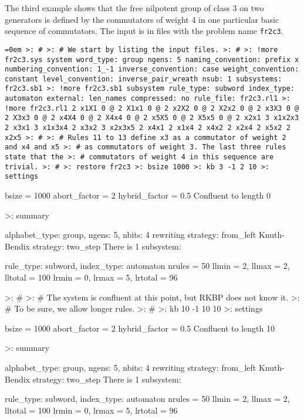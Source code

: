 \bigskip

The third example shows that the free nilpotent group of class 3 on
two generators is defined by the commutators of weight 4 in one
particular basic sequence of commutators.  The input is in files with
the problem name {\tt fr2c3}.

\bigskip

{\tt \obeylines\obeyspaces \parindent=0em \parskip=0in \ttspace
>: \#
>: \# We start by listing the input files.
>: \#
>: !more fr2c3.sys
system
word\_type:  group
ngens:  5
naming\_convention:  prefix x
numbering\_convention:  1\_-1
inverse\_convention:  case
weight\_convention:  constant
level\_convention:  inverse\_pair\_wreath
nsub:  1
subsystems:  
fr2c3.sb1
>: !more fr2c3.sb1
subsystem
rule\_type:  subword
index\_type:  automaton
external:  len\_names
compressed:  no
rule\_file:  fr2c3.rl1
>: !more fr2c3.rl1
2 x1X1 0 @
2 X1x1 0 @
2 x2X2 0 @
2 X2x2 0 @
2 x3X3 0 @
2 X3x3 0 @
2 x4X4 0 @
2 X4x4 0 @
2 x5X5 0 @
2 X5x5 0 @
2 x2x1 3 x1x2x3
2 x3x1 3 x1x3x4
2 x3x2 3 x2x3x5
2 x4x1 2 x1x4
2 x4x2 2 x2x4
2 x5x2 2 x2x5
>: \#
>: \# Rules 11 to 13 define x3 as a commutator of weight 2 and x4 and x5
>: \# as commutators of weight 3.  The last three rules state that the
>: \# commutators of weight 4 in this sequence are trivial.
>: \#
>: restore fr2c3
>: bsize 1000
>: kb 3 -1 2 10
>: settings

bsize         = 1000
abort\_factor  =      2
hybrid\_factor =      0.5
Confluent to length 0

>: summary

alphabet\_type:  group,  ngens:  5,   nbits:  4
rewriting strategy:  from\_left
Knuth-Bendix strategy:  two\_step
There is 1 subsystem:

rule\_type:  subword,  index\_type:  automaton
nrules = 50
llmin  = 2,  llmax = 2,  lltotal = 100
lrmin  = 0,  lrmax = 5,  lrtotal = 96

>: \#
>: \# The system is confluent at this point, but RKBP does not know it.
>: \# To be sure, we allow longer rules.
>: \#
>: kb 10 -1 10 10
>: settings

bsize         = 1000
abort\_factor  =      2
hybrid\_factor =      0.5
Confluent to length 10

>: summary

alphabet\_type:  group,  ngens:  5,   nbits:  4
rewriting strategy:  from\_left
Knuth-Bendix strategy:  two\_step
There is 1 subsystem:

rule\_type:  subword,  index\_type:  automaton
nrules = 50
llmin  = 2,  llmax = 2,  lltotal = 100
lrmin  = 0,  lrmax = 5,  lrtotal = 96
}

